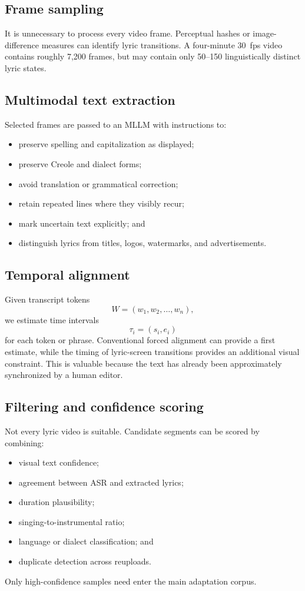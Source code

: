 \documentclass[10pt,twocolumn]{article}
\begin{document}
\subsection{Frame sampling}
It is unnecessary to process every video frame. Perceptual hashes or image-difference measures can identify lyric transitions. A four-minute 30~fps video contains roughly 7,200 frames, but may contain only 50--150 linguistically distinct lyric states.

\subsection{Multimodal text extraction}
Selected frames are passed to an MLLM with instructions to:
\begin{itemize}
\item preserve spelling and capitalization as displayed;
\item preserve Creole and dialect forms;
\item avoid translation or grammatical correction;
\item retain repeated lines where they visibly recur;
\item mark uncertain text explicitly; and
\item distinguish lyrics from titles, logos, watermarks, and advertisements.
\end{itemize}

\subsection{Temporal alignment}
Given transcript tokens
\begin{equation}
W=(w_1,w_2,\ldots,w_n),
\end{equation}
we estimate time intervals
\begin{equation}
\tau_i=(s_i,e_i)
\end{equation}
for each token or phrase. Conventional forced alignment can provide a first estimate, while the timing of lyric-screen transitions provides an additional visual constraint. This is valuable because the text has already been approximately synchronized by a human editor.

\subsection{Filtering and confidence scoring}
Not every lyric video is suitable. Candidate segments can be scored by combining:
\begin{itemize}
\item visual text confidence;
\item agreement between ASR and extracted lyrics;
\item duration plausibility;
\item singing-to-instrumental ratio;
\item language or dialect classification; and
\item duplicate detection across reuploads.
\end{itemize}
Only high-confidence samples need enter the main adaptation corpus.
\end{document}
